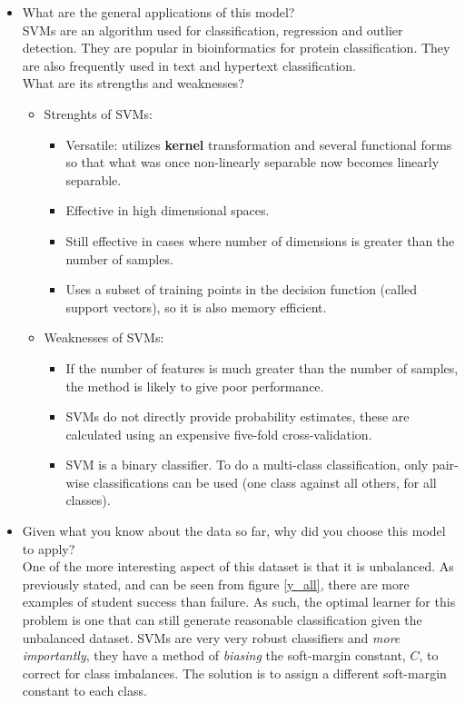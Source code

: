 \documentclass[12pt]{article}
\begin{document}
\begin{itemize}
\item What are the general applications of this model?\\ 
SVMs are an algorithm used for classification, regression and outlier detection. They are popular in bioinformatics for protein classification. They are also frequently used in text and hypertext classification. \\
What are its strengths and weaknesses?
\begin{itemize}
       \item Strenghts of SVMs:
              \begin{itemize}[noitemsep,nolistsep]
                     \item Versatile: utilizes \textbf{kernel} transformation and several functional forms so that what was once non-linearly separable now becomes linearly separable.
                     \item Effective in high dimensional spaces.
                     \item Still effective in cases where number of dimensions is greater than the number of samples.
                     \item Uses a subset of training points in the decision function (called support vectors), so it is also memory efficient.
              \end{itemize}
       \item Weaknesses of SVMs:
              \begin{itemize}[noitemsep,nolistsep]
                     \item If the number of features is much greater than the number of samples, the method is likely to give poor performance.
                     \item SVMs do not directly provide probability estimates, these are calculated using an expensive five-fold cross-validation.
                     \item SVM is a binary classifier. To do a multi-class classification, only pair-wise classifications can be used (one class against all others, for all classes).
              \end{itemize}
       \end{itemize}

\item Given what you know about the data so far, why did you choose this model to apply?\\
One of the more interesting aspect of this dataset is that it is unbalanced. As previously stated, and can be seen from figure \ref{y_all}, there are more examples of student success than failure. As such, the optimal learner for this problem is one that can still generate reasonable classification given the unbalanced dataset. SVMs are very very robust classifiers and \textit{more importantly}, they have a method of \textit{biasing} the soft-margin constant, $C$, to correct for class imbalances. The solution is to assign a different soft-margin constant to each class.

\end{itemize}
\end{document}
